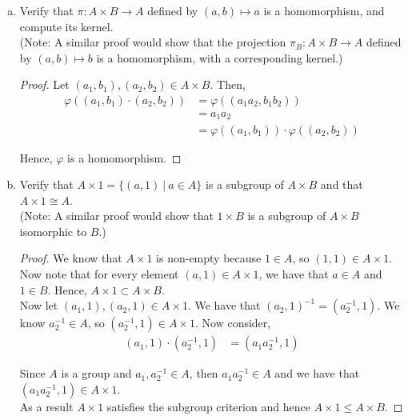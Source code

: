 \documentclass[11pt, reqno]{amsart}
\theoremstyle{plain}
\theoremstyle{definition}
\theoremstyle{example}
\begin{document}
\begin{enumerate}[1.]
\begin{enumerate}[(a)]
\begin{proof}
Hence, $A \times B$ is a group.
\end{proof}

\item Verify that $\pi: A \times B \to A$ defined by $(a,b) \mapsto a$ is a homomorphism, and compute its kernel.\\
(Note: A similar proof would show that  the projection $\pi_B: A \times B \to A$ defined by $(a,b) \mapsto b$ is a homomorphism, with a corresponding kernel.)
\begin{proof}
Let $(a_1, b_1), (a_2, b_2) \in A \times B$. Then,
\begin{align*}
\varphi((a_1, b_1) \cdot (a_2, b_2)) &= \varphi((a_1a_2, b_1b_2))\\
&= a_1a_2\\
&= \varphi((a_1, b_1)) \cdot \varphi((a_2, b_2))
\end{align*}

Hence, $\varphi$ is a homomorphism.
\end{proof}

\item Verify that $A \times 1 = \{(a,1) ~|~ a \in A\}$ is a subgroup of $A \times B$ and that $A \times 1 \cong A$. \\
(Note: A similar proof would show that  $1 \times B$ is a  subgroup of $A \times B$ isomorphic to $B$.)
\begin{proof}
We know that $A \times 1$ is non-empty because $1 \in A$, so $(1, 1) \in A \times 1$.\\

Now note that for every element $(a, 1) \in A \times 1$, we have that $a \in A$ and $1 \in B$. Hence, $A \times 1 \subset A \times B$.\\

Now let $(a_1, 1), (a_2, 1) \in A \times 1$. We have that $(a_2, 1)^{-1} = (a_2^{-1}, 1)$. We know $a_2^{-1} \in A$, so $(a_2^{-1}, 1) \in A \times 1$. Now consider,
\begin{align*}
(a_1, 1) \cdot (a_2^{-1}, 1) &= (a_1a_2^{-1}, 1)
\end{align*}

Since $A$ is a group and $a_1, a_2^{-1} \in A$, then $a_1a_2^{-1} \in A$ and we have that $(a_1a_2^{-1}, 1) \in A \times 1$.\\

As a result $A \times 1$ satisfies the subgroup criterion and hence $A \times 1 \leqslant A \times B$.
\end{proof}
\end{enumerate}



\end{enumerate}
\end{document}

